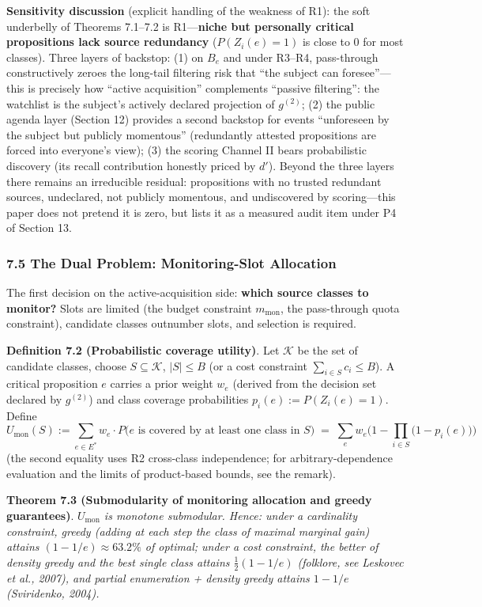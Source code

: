 \documentclass[
  11pt]{article}
\begin{document}
\textbf{Sensitivity discussion} (explicit handling of the weakness of
R1): the soft underbelly of Theorems 7.1--7.2 is R1---\textbf{niche but
personally critical propositions lack source redundancy}
(\(P(Z_i(e)=1)\) is close to 0 for most classes). Three layers of
backstop: (1) on \(B_e\) and under R3--R4, pass-through constructively
zeroes the long-tail filtering risk that ``the subject can
foresee''---this is precisely how ``active acquisition'' complements
``passive filtering'': the watchlist is the subject's actively declared
projection of \(g^{(2)}\); (2) the public agenda layer (Section 12)
provides a second backstop for events ``unforeseen by the subject but
publicly momentous'' (redundantly attested propositions are forced into
everyone's view); (3) the scoring Channel II bears probabilistic
discovery (its recall contribution honestly priced by \(d'\)). Beyond
the three layers there remains an irreducible residual: propositions
with no trusted redundant sources, undeclared, not publicly momentous,
and undiscovered by scoring---this paper does not pretend it is zero,
but lists it as a measured audit item under P4 of Section 13.

\subsubsection{7.5 The Dual Problem: Monitoring-Slot
Allocation}\label{the-dual-problem-monitoring-slot-allocation}

The first decision on the active-acquisition side: \textbf{which source
classes to monitor?} Slots are limited (the budget constraint
\(m_{\mathrm{mon}}\), the pass-through quota constraint), candidate
classes outnumber slots, and selection is required.

\textbf{Definition 7.2 (Probabilistic coverage utility)}. Let
\(\mathcal{K}\) be the set of candidate classes, choose
\(S \subseteq \mathcal{K}\), \(|S| \le B\) (or a cost constraint
\(\sum_{i\in S} c_i \le B\)). A critical proposition \(e\) carries a
prior weight \(w_e\) (derived from the decision set declared by
\(g^{(2)}\)) and class coverage probabilities \(p_i(e) := P(Z_i(e)=1)\).
Define
\[U_{\mathrm{mon}}(S) := \sum_{e \in E^*} w_e \cdot P\big(e \text{ is covered by at least one class in } S\big) \;=\; \sum_{e} w_e \Big(1 - \prod_{i \in S}\big(1 - p_i(e)\big)\Big)\]
(the second equality uses R2 cross-class independence; for
arbitrary-dependence evaluation and the limits of product-based bounds,
see the remark).

\textbf{Theorem 7.3 (Submodularity of monitoring allocation and greedy
guarantees)}. \emph{\(U_{\mathrm{mon}}\) is monotone submodular. Hence:
under a cardinality constraint, greedy (adding at each step the class of
maximal marginal gain) attains \((1-1/e) \approx 63.2\%\) of optimal;
under a cost constraint, the better of density greedy and the best
single class attains \(\frac12(1-1/e)\) (folklore, see Leskovec et al.,
2007), and partial enumeration + density greedy attains \(1-1/e\)
(Sviridenko, 2004).}
\end{document}
